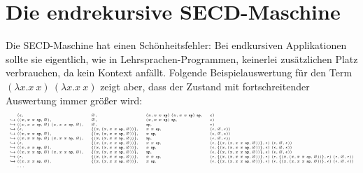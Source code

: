 \section{Die endrekursive SECD-Maschine}

Die SECD-Maschine hat einen Schönheitsfehler: Bei endkursiven
Applikationen sollte sie eigentlich, wie in Lehrsprachen-Programmen, keinerlei
zusätzlichen Platz verbrauchen, da kein Kontext anfällt.  Folgende
Beispielauswertung für den Term $(\lambda x.x~x)~(\lambda x.x~x)$
zeigt aber, dass der Zustand mit fortschreitender Auswertung immer
größer wird:
%
\begin{displaymath}\tiny
  \begin{array}{l@{}llll}
&(\epsilon, &\varnothing, &(x, x~x~\mathtt{ap})~(x, x~x~\mathtt{ap})~\mathtt{ap}, &\epsilon)\\
\hookrightarrow{}&((x, x~x~\mathtt{ap}, \varnothing), &\varnothing, &(x, x~x~\mathtt{ap})~\mathtt{ap}, &\epsilon)\\
\hookrightarrow{}&((x, x~x~\mathtt{ap}, \varnothing)~(x, x~x~\mathtt{ap}, \varnothing), &\varnothing, &\mathtt{ap}, &\epsilon)\\
\hookrightarrow{}&(\epsilon, &\{(x, (x, x~x~\mathtt{ap}, \varnothing))\}, &x~x~\mathtt{ap}, &(\epsilon, \varnothing, \epsilon))\\
\hookrightarrow{}&((x, x~x~\mathtt{ap}, \varnothing), &\{(x, (x, x~x~\mathtt{ap}, \varnothing))\}, &x~\mathtt{ap}, &(\epsilon, \varnothing, \epsilon))\\
\hookrightarrow{}&((x, x~x~\mathtt{ap}, \varnothing)~(x, x~x~\mathtt{ap}, \varnothing), &\{(x, (x, x~x~\mathtt{ap}, \varnothing))\}, &\mathtt{ap}, &(\epsilon, \varnothing, \epsilon))\\
\hookrightarrow{}&(\epsilon, &\{(x, (x, x~x~\mathtt{ap}, \varnothing))\}, &x~x~\mathtt{ap}, &(\epsilon, \{(x, (x, x~x~\mathtt{ap}, \varnothing))\}, \epsilon)~(\epsilon, \varnothing, \epsilon))\\
\hookrightarrow{}&((x, x~x~\mathtt{ap}, \varnothing), &\{(x, (x, x~x~\mathtt{ap}, \varnothing))\}, &x~\mathtt{ap}, &(\epsilon, \{(x, (x, x~x~\mathtt{ap}, \varnothing))\}, \epsilon)~(\epsilon, \varnothing, \epsilon))\\
\hookrightarrow{}&((x, x~x~\mathtt{ap}, \varnothing)~(x, x~x~\mathtt{ap}, \varnothing), &\{(x, (x, x~x~\mathtt{ap}, \varnothing))\}, &\mathtt{ap}, &(\epsilon, \{(x, (x, x~x~\mathtt{ap}, \varnothing))\}, \epsilon)~(\epsilon, \varnothing, \epsilon))\\
\hookrightarrow{}&(\epsilon, &\{(x, (x, x~x~\mathtt{ap}, \varnothing))\}, &x~x~\mathtt{ap}, &(\epsilon, \{(x, (x, x~x~\mathtt{ap}, \varnothing))\}, \epsilon)~(\epsilon, \{(x, (x, x~x~\mathtt{ap}, \varnothing))\}, \epsilon)~(\epsilon, \varnothing, \epsilon))\\
\hookrightarrow{}&((x, x~x~\mathtt{ap}, \varnothing), &\{(x, (x, x~x~\mathtt{ap}, \varnothing))\}, &x~\mathtt{ap}, &(\epsilon, \{(x, (x, x~x~\mathtt{ap}, \varnothing))\}, \epsilon)~(\epsilon, \{(x, (x, x~x~\mathtt{ap}, \varnothing))\}, \epsilon)~(\epsilon, \varnothing, \epsilon))
\\
& \ldots
  \end{array}
\end{displaymath}
